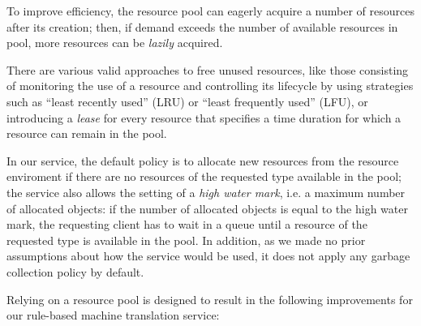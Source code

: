 \documentclass[11pt]{article}
\begin{document}
To improve efficiency, the resource pool can eagerly acquire a number of resources after its creation; then, if demand exceeds the number of available resources in pool, more resources can be \emph{lazily} acquired.

There are various valid approaches to free unused resources, like those consisting of monitoring the use of a resource and controlling its lifecycle by using  strategies such as ``least recently used'' (LRU) or ``least frequently used'' (LFU), or introducing a \emph{lease} for every resource that specifies a time duration for which a resource can remain in the pool.

In our service, the default policy is to allocate new resources from the resource enviroment if there are no resources of the requested type available in the pool; the service also allows the setting of a \emph{high water mark}, i.e. a maximum number of allocated objects: if the number of allocated objects is equal to the high water mark, the requesting client has to wait in a queue until a resource of the requested type is available in the pool. In addition, as we made no prior assumptions about how the service would be used, it does not apply any garbage collection policy by default.

Relying on a resource pool is designed to result in the following improvements for our rule-based machine translation service:
\end{document}
